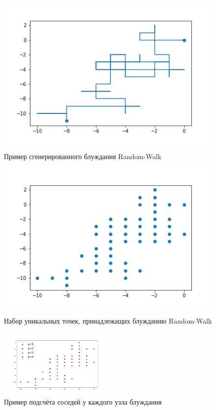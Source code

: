 \begin{figure}[h]
    
\begin{minipage}{0.49\textwidth}
    \includegraphics[width=\textwidth]{Sections/Images/Rand_Path.png}
    \caption{Пример сгенерированного блуждания Random-Walk}
    \label{fig:path_1}
\end{minipage}
\hfill
\begin{minipage}{0.49\textwidth}
    \includegraphics[width=\textwidth]{Sections/Images/Rand_Path_Unique.png}
    \caption{Набор уникальных точек, принадлежащих блужданию Random-Walk}
    \label{fig:path_2}
\end{minipage}
\centering
\includegraphics[width=0.5\textwidth]{Sections/Images/Rand_Path_Neigh.png}
\caption{Пример подсчёта соседей у каждого узла блуждания}
\label{fig:path_3}
\end{figure}

